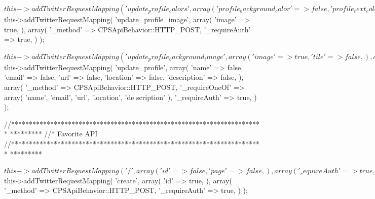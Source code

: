 \begin{DoxyCode}
{        $this->addTwitterRequestMapping( 'update_profile_colors',
            array(
                'profile_background_color' => false,
                'profile_text_color' => false,
                'profile_link_color' => false,
                'profile_sidebar_fill_color' => false,
                'profile_sidebar_border_color' => false,
            ),
            array(
                '_method' => CPSApiBehavior::HTTP_POST,
                '_requireOneOf' => array( 'profile_background_color', 'profile_te
      xt_color', 'profile_link_color', 'profile_sidebar_fill_color', 'profile_sidebar_b
      order_color' ),
                '_requireAuth' => true,
            )
        );

        $this->addTwitterRequestMapping( 'update_profile_image',
            array(
                'image' => true,
            ),
            array(
                '_method' => CPSApiBehavior::HTTP_POST,
                '_requireAuth' => true,
            )
        );

        $this->addTwitterRequestMapping( 'update_profile_background_image',
            array(
                'image' => true,
                'tile' => false,
            ),
            array(
                '_method' => CPSApiBehavior::HTTP_POST,
                '_requireAuth' => true,
            )
        );

        $this->addTwitterRequestMapping( 'update_profile',
            array(
                'name' => false,
                'email' => false,
                'url' => false,
                'location' => false,
                'description' => false,
            ),
            array(
                '_method' => CPSApiBehavior::HTTP_POST,
                '_requireOneOf' => array( 'name', 'email', 'url', 'location', 'de
      scription' ),
                '_requireAuth' => true,
            )
        );

        //***********************************************************************
      *********
        //* Favorite API
        //***********************************************************************
      *********

        $this->addTwitterRequestMapping( '/',
            array(
                'id' => false,
                'page' => false,
            ),
            array(
                '_requireAuth' => true,
            ),
            self::FAVORITE_API
        );

        $this->addTwitterRequestMapping( 'create',
            array(
                'id' => true,
            ),
            array(
                '_method' => CPSApiBehavior::HTTP_POST,
                '_requireAuth' => true,
            )
        );

}
\end{DoxyCode}
